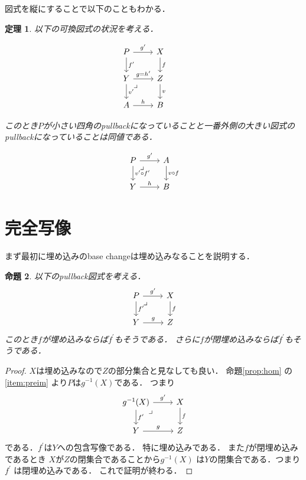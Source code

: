 \documentclass[leqno, a4paper, 12pt, dvipdfmx]{jsarticle}
\newtheorem{thm}{定理}
\newtheorem{prop}[thm]{命題}
\begin{document}
図式を縦にすることで以下のこともわかる．

\begin{thm}\label{thm:tate}
以下の可換図式の状況を考える．



\[
\begin{tikzcd}
P \arrow[r, "g^{\prime}"] \arrow[d, "f^{\prime}"] & X \arrow[d,"f"] & \\
Y  \arrow[dr, phantom, "\lrcorner", very near start]\arrow[r,"g=h^{\prime}"] \arrow[d,"v^{\prime}"] & Z \arrow[d,"v"] \\
A\arrow[r,"h"] &  B
\end{tikzcd}
\]

このとき$P$が小さい四角のpullbackになっていることと一番外側の大きい図式のpullbackになっていることは同値である．


\[
\begin{tikzcd}
P \arrow[r, "g^{\prime}"] \arrow[d, "v^{\prime}\circ f^{\prime}"] \arrow[dr, phantom, "\lrcorner", very near start]
& A \arrow[d,"v\circ f"] \\
Y \arrow[r,"h"] & B
\end{tikzcd}
\]

\end{thm}





\section{完全写像}

まず最初に埋め込みのbase changeは埋め込みなることを説明する．
\begin{prop}\label{prop:cloimm}
以下のpullback図式を考える．
\[
\begin{tikzcd}
P \arrow[r, "g^{\prime}"] \arrow[d, "f^{\prime}"] \arrow[dr, phantom, "\lrcorner", very near start]
& X \arrow[d,"f"] \\
Y \arrow[r,"g"] & Z
\end{tikzcd}
\]
このとき$f$が埋め込みならば$f^{\prime}$もそうである．
さらに$f$が閉埋め込みならば$f^{\prime}$もそうである．
\end{prop}
\begin{proof}
$X$は埋め込みなので$Z$の部分集合と見なしても良い．
命題\ref{prop:hom}
の\ref{item:preim}
より$P$は$g^{-1}(X)$である．
つまり
\[
\begin{tikzcd}
g^{-1}(X) \arrow[r, "g^{\prime}"] \arrow[d, "f^{\prime}"] \arrow[dr, phantom, "\lrcorner", very near start]
& X \arrow[d,"f"] \\
Y \arrow[r,"g"] & Z
\end{tikzcd}
\]
である．$f^{\prime}$は$Y$への包含写像である．
特に埋め込みである．
また$f$が閉埋め込みであるとき
$X$が$Z$の閉集合であることから$g^{-1}(X)$
は$Y$の閉集合である．つまり$f^{\prime}$
は閉埋め込みである．
これで証明が終わる．
\end{proof}
\end{document}
